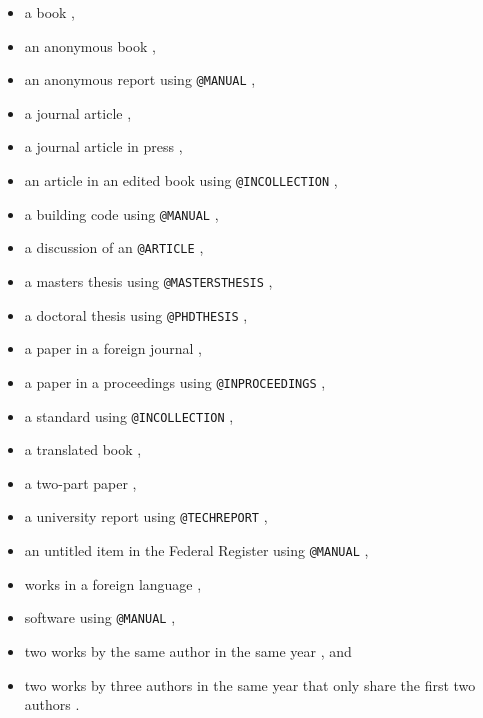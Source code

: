 \documentclass[Journal,letterpaper]{ascelike-new}
\begin{document}
	\begin{itemize}
		\item a book \cite{Goossens:1994a},
		\item an anonymous book \cite{Moody:1988a}, 
		\item an anonymous report using \texttt{@MANUAL} \cite{FHWA:1991a}, 
		\item a journal article \cite{Stahl:2004a,Pennoni:1992a}, 
		\item a journal article in press \cite{Dasgupta:2008a},
		\item an article in an edited book using \texttt{@INCOLLECTION} \cite{Zadeh:1981a}, 
		\item a building code using \texttt{@MANUAL} \cite{ICBO:1988a}, 
		\item a discussion of an \texttt{@ARTICLE} \cite{Vesilind:1992a}, 
		\item a masters thesis using \texttt{@MASTERSTHESIS} \cite{Sotiropulos:1991a},
		\item a doctoral thesis using \texttt{@PHDTHESIS} \cite{Chang:1987a}, 
		\item a paper in a foreign journal \cite{Ireland:1954a}, 
		\item a paper in a proceedings using \texttt{@INPROCEEDINGS} 
		\cite{Eshenaur:1991a,Garrett:2003a}, 
		\item a standard using \texttt{@INCOLLECTION} \cite{ASTM:1991a}, 
		\item a translated book \cite{Melan:1913a}, 
		\item a two-part paper \cite{Frater:1992a,Frater:1992b}, 
		\item a university report using \texttt{@TECHREPORT} \cite{Duan:1990a}, 
		\item an untitled item in the Federal Register using 
		\texttt{@MANUAL} \cite{FR:1968a}, 
		\item works in a foreign language \cite{Duvant:1972a,Reiffenstuhl:1982a},
		\item software using \texttt{@MANUAL} \cite{Lotus:1985a},
		\item two works by the same author in the same year
		\cite{Gaspar:2001b,Gaspar:2001a}, and
		\item two works by three authors in the same year that only share
		the first two authors \cite{Huang2009a,Huang2009b}.
	\end{itemize}
	\par
\end{document}
